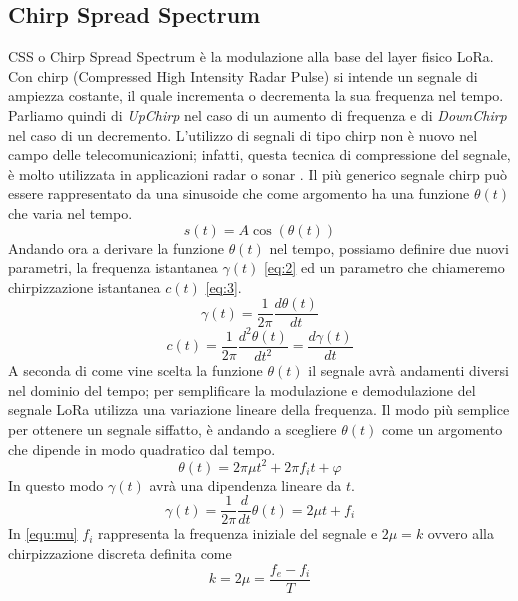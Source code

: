\subsection{Chirp Spread Spectrum}
CSS o Chirp Spread Spectrum è la modulazione alla base del layer fisico LoRa. 
Con chirp (Compressed High Intensity Radar Pulse) si intende un segnale di
ampiezza costante, il quale incrementa o decrementa la sua frequenza nel tempo.
Parliamo quindi di \emph{UpChirp} nel caso di un aumento di frequenza e di
\emph{DownChirp} nel caso di un decremento.
L'utilizzo di segnali di tipo chirp non è nuovo nel campo delle
telecomunicazioni; infatti, questa tecnica di compressione del segnale, 
è molto utilizzata in applicazioni radar o  sonar .
Il più generico segnale chirp può essere rappresentato da una sinusoide che come
argomento ha una funzione $\theta(t)$ che varia nel tempo.
\begin{equation}\label{eq:1}
        s(t) = A\cos(\theta (t))
\end{equation}
Andando ora a derivare la funzione  $\theta(t)$ nel tempo, possiamo  definire due
nuovi parametri, la frequenza istantanea $\gamma(t)$ \ref{eq:2} ed un parametro che
chiameremo chirpizzazione istantanea $c(t)$ \ref{eq:3}.
\begin{equation}\label{eq:2}
        \gamma(t) = \frac{1}{2\pi} \frac{d\theta(t)}{dt}
\end{equation}
\begin{equation}\label{eq:3}
        c(t) = \frac{1}{2\pi}\frac{d^2\theta(t)}{dt^2} = \frac{d\gamma(t)}{dt}
\end{equation}
A seconda di come vine scelta la funzione $\theta(t)$ il segnale avrà
andamenti diversi nel dominio del tempo; per semplificare la modulazione e
demodulazione del segnale LoRa utilizza una variazione lineare della frequenza.
Il modo più semplice per ottenere un segnale siffatto, è andando a scegliere $\theta(t)$
come un argomento che dipende in modo quadratico dal tempo.
\begin{equation}
        \theta(t) = 2\pi\mu t^2+2\pi f_it+\varphi
\end{equation}
In questo modo $\gamma(t)$ avrà una dipendenza lineare da $t$.
\begin{equation}\label{equ:mu}
        \gamma(t) = \frac{1}{2\pi}\frac{d}{dt}\theta(t)  = 2\mu t+ f_i
\end{equation}
In \ref{equ:mu} $f_i$ rappresenta la frequenza iniziale del segnale e $2\mu = k$ ovvero
alla chirpizzazione discreta definita come
\begin{equation}\label{equ:chirpizzazione}
        k =2\mu =  \frac{f_e-f_i}{T}
\end{equation}
